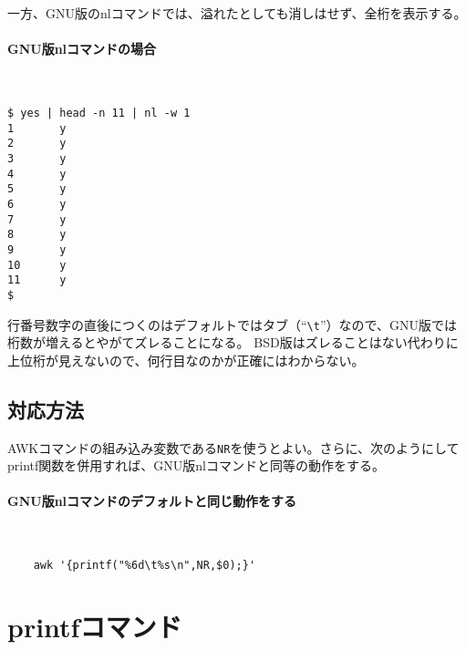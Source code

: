 一方、GNU版のnlコマンドでは、溢れたとしても消しはせず、全桁を表示する。

\paragraph{GNU版nlコマンドの場合} 　\\
\begin{screen}
	\verb!$ yes | head -n 11 | nl -w 1! \return \\
	\verb|1       y| \\
	\verb|2       y| \\
	\verb|3       y| \\
	\verb|4       y| \\
	\verb|5       y| \\
	\verb|6       y| \\
	\verb|7       y| \\
	\verb|8       y| \\
	\verb|9       y| \\
	\verb|10      y| \\
	\verb|11      y| \\
	\verb|$ |
\end{screen}

行番号数字の直後につくのはデフォルトではタブ（``\verb|\t|''）なので、GNU版では桁数が増えるとやがてズレることになる。
BSD版はズレることはない代わりに上位桁が見えないので、何行目なのかが正確にはわからない。

\subsection*{対応方法}

AWKコマンドの組み込み変数である\verb|NR|を使うとよい。さらに、次のようにしてprintf関数を併用すれば、GNU版nlコマンドと同等の動作をする。

\paragraph{GNU版nlコマンドのデフォルトと同じ動作をする} 　\\
\begin{frameboxit}{160.0mm}
\begin{verbatim}
	awk '{printf("%6d\t%s\n",NR,$0);}'
\end{verbatim}
\end{frameboxit}

\section{printfコマンド}
\label{allenvs:printf}

